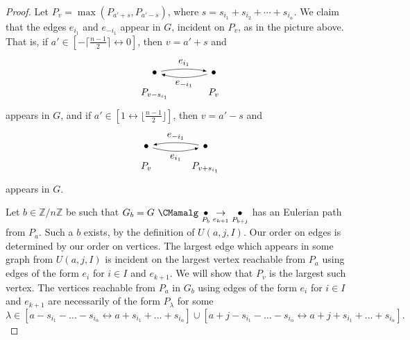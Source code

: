 \documentclass{amsproc}
\theoremstyle{definition}
\theoremstyle{remark}
\numberwithin{equation}{section}
\newcommand{\Z}{{\mathbb Z}}
\newcommand{\nodeDist}{2}
\newcommand{\interval}{\longleftrightarrow}
\begin{document}
\begin{proof}
Let $P_v=\max(P_{a'+s},P_{a'-s})$, where $s=s_{i_1}+s_{i_2}+\cdots+s_{i_\alpha}$. We claim that the edges $e_{i_1}$ and $e_{-i_1}$ appear in $G$, incident on $P_v$, as in the picture above. That is, if $a'\in[-\lceil \frac{n-1}{2}\rceil\interval 0]$, then $v=a'+s$ and
\[
\begin{tikzpicture}[baseline,vertex/.style={anchor=base, circle, fill,minimum size=4pt, inner sep=0pt, outer sep=0pt},auto,
                               edge/.style={->,>=latex, shorten > = 5pt,shorten < = 5pt},
position/.style args={#1:#2 from #3}{
    at=(#3.#1), anchor=#1+180, shift=(#1:#2)
}]
  \node[vertex] (v1) {};
  \node[vertex,position = 0:{\nodeDist} from v1] (v2) {};

  \draw (v1) node[below = 13] {$P_{v-s_{i_1}}$};
  \draw (v2) node[below = 13] {$P_{v}$};

  \draw[edge] (v1) to [bend left=10] node[above] {$e_{i_1}$} (v2);
  \draw[edge] (v2) to [bend left=15] node[below] {$e_{-i_1}$} (v1);
\end{tikzpicture}
\]
appears in $G$, and if $a'\in[1 \interval \lfloor \frac{n-1}2\rfloor]$, then $v=a'-s$ and
\[
\begin{tikzpicture}[baseline,vertex/.style={anchor=base, circle, fill,minimum size=4pt, inner sep=0pt, outer sep=0pt},auto,
                               edge/.style={->,>=latex, shorten > = 5pt,shorten < = 5pt},
position/.style args={#1:#2 from #3}{
    at=(#3.#1), anchor=#1+180, shift=(#1:#2)
}]
  \node[vertex] (v1) {};
  \node[vertex,position = 0:{\nodeDist} from v1] (v2) {};

  \draw (v1) node[below = 13] {$P_{v}$};
  \draw (v2) node[below = 13] {$P_{v+s_{i_1}}$};

  \draw[edge] (v1) to [bend right=15] node[below] {$e_{i_1}$} (v2);
  \draw[edge] (v2) to [bend right=10] node[above] {$e_{-i_1}$} (v1);
\end{tikzpicture}
\]
appears in $G$.

Let $b\in \Z/n\Z$ be such that $G_b=G\ \CMamalg\ \underset {P_b} \bullet \underset {e_{k+1}} \rightarrow \underset {P_{b+j}} \bullet$ has an Eulerian path from $P_a$. Such a $b$ exists, by the definition of $U(a,j,I)$.
Our order on edges is determined by our order on vertices. The largest edge which appears in some graph from $U(a,j,I)$ is incident on the largest vertex reachable from $P_a$ using edges of the form $e_i$ for $i\in I$ and $e_{k+1}$. We will show that $P_v$ is the largest such vertex.
The vertices reachable from $P_a$ in $G_b$ using edges of the form $e_i$ for $i\in I$ and $e_{k+1}$ are necessarily of the form $P_\lambda$ for some 
\[ \lambda\in[a-s_{i_1}-\dots-s_{i_\alpha}\interval a+s_{i_1}+\dots+s_{i_\alpha}]\cup[a+j-s_{i_1}-\dots-s_{i_\alpha}\interval a+j+s_{i_1}+\dots+s_{i_\alpha}]. \] 



\end{proof}
\end{document}
